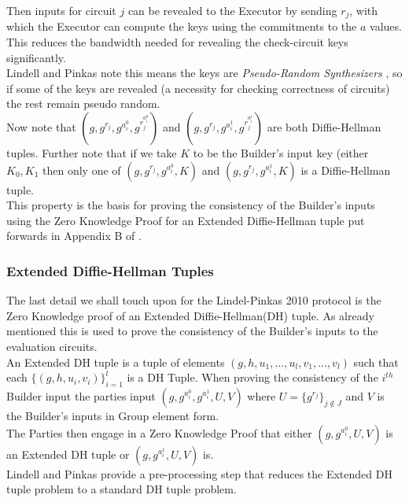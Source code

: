 \documentclass[ %
                    author={Nicholas Tutte},
                supervisor={Prof. Nigel Smart},
                    degree={MEng},
                     title={Secure Two Party Computation},
                  subtitle={A practical comparison of recent protocols},
                      type={Research - GG1K},
                      year={2015} ]{dissertation}
\begin{document}
				Then inputs for circuit $j$ can be revealed to the Executor by sending $r_j$, with which the Executor can compute the keys using the commitments to the $a$ values. This reduces the bandwidth needed for revealing the check-circuit keys significantly.\\

				Lindell and Pinkas note this means the keys are \emph{Pseudo-Random Synthesizers} \cite{PseudoRandomSynth}, so if some of the keys are revealed (a necessity for checking correctness of circuits) the rest remain pseudo random.\\

				Now note that $(g, g^{r_j}, g^{a_i^0}, g^{r_j^{a_i^0}})$ and $(g, g^{r_j}, g^{a_i^1}, g^{r_j^{a_i^1}})$ are both Diffie-Hellman tuples. Further note that if we take $K$ to be the Builder's input key (either $K_0, K_1$  then only one of $(g, g^{r_j}, g^{a_i^0}, K)$ and $(g, g^{r_j}, g^{a_i^1}, K)$ is a Diffie-Hellman tuple.\\

				This property is the basis for proving the consistency of the Builder's inputs using the Zero Knowledge Proof for an Extended Diffie-Hellman tuple put forwards in Appendix B of \cite{LindellAndPinkas2011}.

				\subsubsection{Extended Diffie-Hellman Tuples}
					The last detail we shall touch upon for the Lindel-Pinkas 2010 protocol is the Zero Knowledge proof of an Extended Diffie-Hellman(DH) tuple. As already mentioned this is used to prove the consistency of the Builder's inputs to the evaluation circuits.\\

					An Extended DH tuple is a tuple of elements $(g, h, u_1, ..., u_l, v_1, ..., v_l)$ such that each $\{(g, h, u_i, v_i)\}_{i = 1}^{l}$ is a DH Tuple. When proving the consistency of the $i^{th}$ Builder input the parties input $(g, g^{a_i^0}, g^{a_i^1}, U, V)$ where $U = \{g^{r_j}\}_{j \notin J}$ and $V$ is the Builder's inputs in Group element form.\\

					The Parties then engage in a Zero Knowledge Proof that either $(g, g^{a_i^0}, U, V)$ is an Extended DH tuple or $(g, g^{a_i^1}, U, V)$ is.\\

					Lindell and Pinkas provide a pre-processing step that reduces the Extended DH tuple problem to a standard DH tuple problem. 
\end{document}

